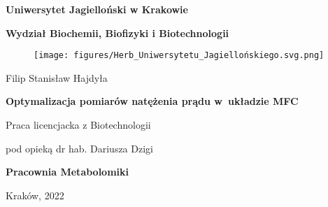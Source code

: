 \begin{titlepage}
    \begin{center}
    
        \textbf{\large Uniwersytet Jagielloński w Krakowie}
        
        \vspace{0.5cm}
        
        \textbf{\Large Wydział Biochemii, Biofizyki i Biotechnologii}
        
        \vspace{0.5cm}
        
        \begin{figure}[h]
            \centering
            \texttt{[image: figures/Herb\_Uniwersytetu\_Jagiellońskiego.svg.png]}
            \label{fig:title}
        \end{figure}
        
        \vspace{0.5cm}
        
        {\Large Filip Stanisław Hajdyła}
        
        \vspace{2cm}
        
        \textbf{\huge Optymalizacja pomiarów natężenia prądu w~układzie MFC}
        
        \vspace{2cm}
        
        {\large Praca licencjacka z Biotechnologii}
        
        \vspace{0.5cm}
        
        {\large pod opieką dr hab. Dariusza Dzigi}
        
        \vspace{1cm}
        
        \textbf{\Large Pracownia Metabolomiki}
        
        \vspace{1cm}
        
        Kraków, 2022
        
    \end{center}
\end{titlepage}